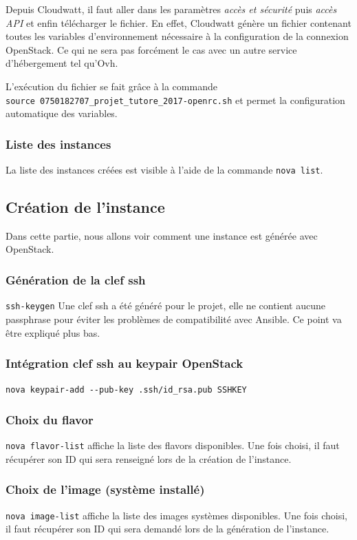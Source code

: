 \documentclass[]{article}
\begin{document}
Depuis Cloudwatt, il faut aller dans les paramètres \emph{accès et
sécurité} puis \emph{accès API} et enfin télécharger le fichier. En
effet, Cloudwatt génère un fichier contenant toutes les variables
d'environnement nécessaire à la configuration de la connexion OpenStack.
Ce qui ne sera pas forcément le cas avec un autre service d'hébergement tel qu'Ovh.

L'exécution du fichier se fait grâce à la commande
\texttt{source\ 0750182707\_projet\_tutore\_2017-openrc.sh} et permet la
configuration automatique des variables.

\subsubsection{Liste des instances}\label{liste-des-instances}
La liste des instances créées est visible à l'aide de la commande
\texttt{nova\ list}.

\subsection{Création de l'instance}\label{cruxe9ation-de-linstance}
Dans cette partie, nous allons voir comment une instance est générée avec OpenStack.

\subsubsection{Génération de la clef
ssh}\label{guxe9nuxe9ration-de-la-clef-ssh}
\texttt{ssh-keygen}
Une clef ssh a été généré pour le projet, elle ne contient aucune passphrase pour éviter les problèmes de compatibilité avec Ansible. Ce point va être expliqué plus bas.
\subsubsection{Intégration clef ssh au keypair
OpenStack}\label{intuxe9gration-clef-ssh-au-keypair-OpenStack}
\texttt{nova\ keypair-add\ -\/-pub-key\ .ssh/id\_rsa.pub\ SSHKEY}
\subsubsection{Choix du flavor}\label{choix-du-flavor}
\texttt{nova\ flavor-list} affiche la liste des flavors disponibles. Une
fois choisi, il faut récupérer son ID qui sera renseigné lors de la
création de l'instance.
\subsubsection{Choix de l'image (système
installé)}\label{choix-de-limage-systuxe8me-installuxe9}
\texttt{nova\ image-list} affiche la liste des images systèmes
disponibles. Une fois choisi, il faut récupérer son ID qui sera demandé
lors de la génération de l'instance.
\end{document}
